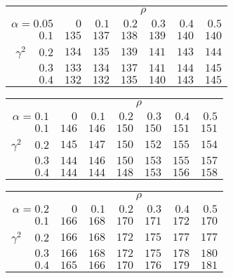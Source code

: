 \begin{tabular}{r|rrrrrr}
\hline\hline
 &\multicolumn{6}{c}{$\rho$} \\ 
 $\alpha = 0.05$ & $0$ & $0.1$ & $0.2$ & $0.3$ & $0.4$ & $0.5$ \\ 
 \hline$0.1$ & $135$ & $137$ & $138$ & $139$ & $140$ & $140$\\ 
$\gamma^2\;\;\;$ $0.2$ & $134$ & $135$ & $139$ & $141$ & $143$ & $144$\\ 
$0.3$ & $133$ & $134$ & $137$ & $141$ & $144$ & $145$\\ 
$0.4$ & $132$ & $132$ & $135$ & $140$ & $143$ & $145$\\ 
 \hline 
 \end{tabular}
 
 \vspace{2em} 
 
\begin{tabular}{r|rrrrrr}
\hline\hline
 &\multicolumn{6}{c}{$\rho$} \\ 
 $\alpha = 0.1$ & $0$ & $0.1$ & $0.2$ & $0.3$ & $0.4$ & $0.5$ \\ 
 \hline$0.1$ & $146$ & $146$ & $150$ & $150$ & $151$ & $151$\\ 
$\gamma^2\;\;\;$ $0.2$ & $145$ & $147$ & $150$ & $152$ & $155$ & $154$\\ 
$0.3$ & $144$ & $146$ & $150$ & $153$ & $155$ & $157$\\ 
$0.4$ & $144$ & $144$ & $148$ & $153$ & $156$ & $158$\\ 
 \hline 
 \end{tabular}
 
 \vspace{2em} 
 
\begin{tabular}{r|rrrrrr}
\hline\hline
 &\multicolumn{6}{c}{$\rho$} \\ 
 $\alpha = 0.2$ & $0$ & $0.1$ & $0.2$ & $0.3$ & $0.4$ & $0.5$ \\ 
 \hline$0.1$ & $166$ & $168$ & $170$ & $171$ & $172$ & $170$\\ 
$\gamma^2\;\;\;$ $0.2$ & $166$ & $168$ & $172$ & $175$ & $177$ & $177$\\ 
$0.3$ & $166$ & $168$ & $172$ & $175$ & $178$ & $180$\\ 
$0.4$ & $165$ & $166$ & $170$ & $176$ & $179$ & $181$\\ 
 \hline 
 \end{tabular}